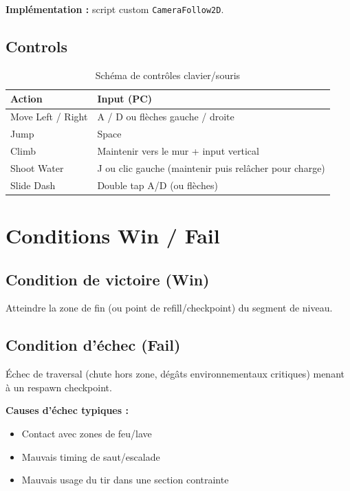﻿\documentclass[12pt,a4paper]{article}
\begin{document}
\textbf{Implémentation :} script custom \texttt{CameraFollow2D}.

\subsection{Controls}

\begin{table}[h]
\centering
\begin{tabularx}{\textwidth}{|l|X|}
\hline
\textbf{Action} & \textbf{Input (PC)} \\ \hline
Move Left / Right & A / D ou flèches gauche / droite \\ \hline
Jump & Space \\ \hline
Climb & Maintenir vers le mur + input vertical \\ \hline
Shoot Water & J ou clic gauche (maintenir puis relâcher pour charge) \\ \hline
Slide Dash & Double tap A/D (ou flèches) \\ \hline
\end{tabularx}
\caption{Schéma de contrôles clavier/souris}
\end{table}

\section{Conditions Win / Fail}

\subsection{Condition de victoire (Win)}
\begin{tcolorbox}[colback=green!10,colframe=green!70!black,title=Win Condition]
Atteindre la zone de fin (ou point de refill/checkpoint) du segment de niveau.
\end{tcolorbox}

\subsection{Condition d'échec (Fail)}
\begin{tcolorbox}[colback=red!10,colframe=red!70!black,title=Fail Condition]
Échec de traversal (chute hors zone, dégâts environnementaux critiques) menant à un respawn checkpoint.
\end{tcolorbox}

\textbf{Causes d'échec typiques :}
\begin{itemize}[noitemsep]
    \item Contact avec zones de feu/lave
    \item Mauvais timing de saut/escalade
    \item Mauvais usage du tir dans une section contrainte
\end{itemize}
\end{document}
